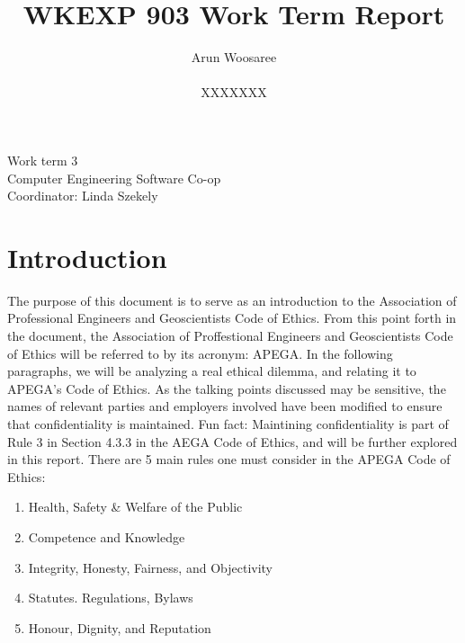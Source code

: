 \documentclass[letterpaper,12pt]{article}
\title{WKEXP 903 Work Term Report}
\author{Arun Woosaree \\ \\ XXXXXXX}
\begin{document}
\relax
\begin{titlepage}
 \maketitle
 \thispagestyle{empty} %
 \centering
 \large
 \vspace{1cm}
 Work term 3\\
 \vspace{1cm}
 Computer Engineering Software Co-op \\
 \vspace{1cm}
 Coordinator: Linda Szekely
\end{titlepage}

\section{Introduction}
The purpose of this document is to serve as an introduction to the Association of Professional Engineers and Geoscientists Code of Ethics\cite{apegacode}.
From this point forth in the document, the Association of Proffestional Engineers and Geoscientists Code of Ethics will be referred to by its acronym: APEGA.
In the following paragraphs, we will be analyzing a real ethical dilemma, and relating it to APEGA's Code of Ethics.
As the talking points discussed may be sensitive, the names of relevant parties and employers involved have been modified to ensure that confidentiality is maintained.
Fun fact: Maintining confidentiality is part of Rule 3 in Section 4.3.3 in the AEGA Code of Ethics, and will be further explored in this report.
There are 5 main rules one must consider in the APEGA Code of Ethics:
\begin{enumerate}
    \setlength{\itemsep}{0pt}
    \setlength{\parskip}{0pt}
    \setlength{\parsep}{0pt} 
    \item Health, Safety \& Welfare of the Public
    \item Competence and Knowledge
    \item Integrity, Honesty, Fairness, and Objectivity
    \item Statutes. Regulations, Bylaws
    \item Honour, Dignity, and Reputation
\end{enumerate}
\end{document}
